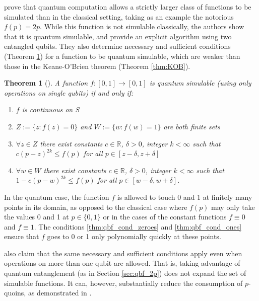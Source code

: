 \documentclass{article}
\newtheorem{thm}{Theorem}
\theoremstyle{definition}
\begin{document}
\citet{dale2015} prove that quantum computation allows a strictly larger class of functions to be simulated than in the classical setting, taking as an example the notorious $f(p)=2p$. While this function is not simulable classically, the authors show that it is quantum simulable, and provide an explicit algorithm using two entangled qubits.
They also determine necessary and sufficient conditions (Theorem \ref{thm:qbf_simulable}) for a function to be quantum simulable, which are weaker than those in the Keane-O'Brien theorem (Theorem \ref{thm:KOB}).


\begin{thm}[{\citet[Theorem 1]{dale2015}}]\label{thm:qbf_simulable}
A function $f:[0,1]\to[0,1]$ %
is quantum simulable (using only operations on single qubits) if and only if:
\begin{enumerate}[label=(\alph*)]
\item $f$ is continuous on S
\item $Z:=\{z:f(z)=0\}$ and $W:=\{w:f(w)=1\}$ are both finite sets
\item\label{thm:qbf_cond_zeroes} $\forall z\in Z$ there exist constants $c\in\mathbb{R}$, $\delta>0$, integer $k<\infty$ such that $c(p-z)^{2k} \leq f(p)$ for all $p \in [z-\delta, z+\delta]$
\item\label{thm:qbf_cond_ones} $\forall w\in W$ there exist constants $c\in\mathbb{R}$, $\delta>0$, integer $k<\infty$ such that $1 - c(p-w)^{2k} \leq f(p)$ for all $p \in [w-\delta, w+\delta]$.
\end{enumerate}
\end{thm}
In the quantum case, the function $f$ is allowed to touch 0 and 1 at finitely many points in its domain, as opposed to the classical case where $f(p)$ may only take the values 0 and 1 at $p\in\{0,1\}$ or in the cases of the constant functions $f\equiv 0$ and $f\equiv 1$.
The conditions \ref{thm:qbf_cond_zeroes} and \ref{thm:qbf_cond_ones} ensure that $f$ goes to 0 or 1 only polynomially quickly at these points.

\citet{dale2015} also claim that the same necessary and sufficient conditions apply even when operations on more than one qubit are allowed. That is, taking advantage of quantum entanglement (as in Section \ref{sec:qbf_2p}) does not expand the set of simulable functions. It can, however, substantially reduce the consumption of $p$-quoins, as demonstrated in \citet{patel2018}.
\end{document}
